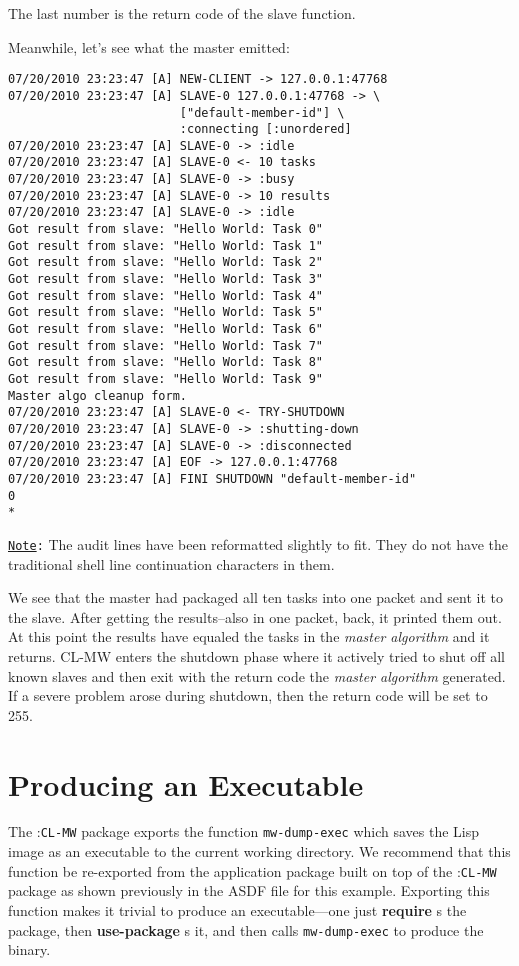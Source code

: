 \documentclass[titlepage,12pt]{book}
\newcommand{\xsmall}{\latexhtml{\small}{}}
\newcommand{\xnormalsize}{\latexhtml{\normalsize}{}}
\newcommand{\clmw}{\xsmall\textsc{CL-MW}\xnormalsize\xspace}
\newcommand{\package}[1]{\mbox{:\uppercase{\xsmall\texttt{#1}\xnormalsize}} package\xspace}
\newcommand{\mwpackage}{\package{CL-MW}}
\newcommand{\ma}{\textit{master algorithm}\xspace}
\newcommand{\func}[1]{\mbox{\texttt{#1}}\xspace}
\newcommand{\bold}[1]{\textbf{#1}\xspace}
\newcommand{\Note}{\texttt{\underline{Note}:}\xspace}
\begin{document}
The last number is the return code of the slave function.

Meanwhile, let's see what the master emitted:

\small
\begin{verbatim}
07/20/2010 23:23:47 [A] NEW-CLIENT -> 127.0.0.1:47768
07/20/2010 23:23:47 [A] SLAVE-0 127.0.0.1:47768 -> \
                        ["default-member-id"] \
                        :connecting [:unordered]
07/20/2010 23:23:47 [A] SLAVE-0 -> :idle
07/20/2010 23:23:47 [A] SLAVE-0 <- 10 tasks
07/20/2010 23:23:47 [A] SLAVE-0 -> :busy
07/20/2010 23:23:47 [A] SLAVE-0 -> 10 results
07/20/2010 23:23:47 [A] SLAVE-0 -> :idle
Got result from slave: "Hello World: Task 0"
Got result from slave: "Hello World: Task 1"
Got result from slave: "Hello World: Task 2"
Got result from slave: "Hello World: Task 3"
Got result from slave: "Hello World: Task 4"
Got result from slave: "Hello World: Task 5"
Got result from slave: "Hello World: Task 6"
Got result from slave: "Hello World: Task 7"
Got result from slave: "Hello World: Task 8"
Got result from slave: "Hello World: Task 9"
Master algo cleanup form.
07/20/2010 23:23:47 [A] SLAVE-0 <- TRY-SHUTDOWN
07/20/2010 23:23:47 [A] SLAVE-0 -> :shutting-down
07/20/2010 23:23:47 [A] SLAVE-0 -> :disconnected
07/20/2010 23:23:47 [A] EOF -> 127.0.0.1:47768
07/20/2010 23:23:47 [A] FINI SHUTDOWN "default-member-id"
0
*
\end{verbatim}
\normalsize

\Note The audit lines have been reformatted slightly to fit. They do
not have the traditional shell line continuation characters in them.

We see that the master had packaged all ten tasks into one packet and
sent it to the slave. After getting the results--also in one packet,
back, it printed them out. At this point the results have equaled
the tasks in the \ma and it returns. \clmw enters the shutdown
phase where it actively tried to shut off all known slaves and then
exit with the return code the \ma generated. If a severe problem
arose during shutdown, then the return code will be set to 255.

\section{Producing an Executable}

The \mwpackage exports the function \func{mw-dump-exec} which saves
the Lisp image as an executable to the current working directory. We
recommend that this function be re-exported from the application
package built on top of the \mwpackage as shown previously in the
ASDF file for this example. Exporting this function makes it trivial
to produce an executable---one just \bold{require}s the package,
then \bold{use-package}s it, and then calls \func{mw-dump-exec}
to produce the binary. 
\end{document}
